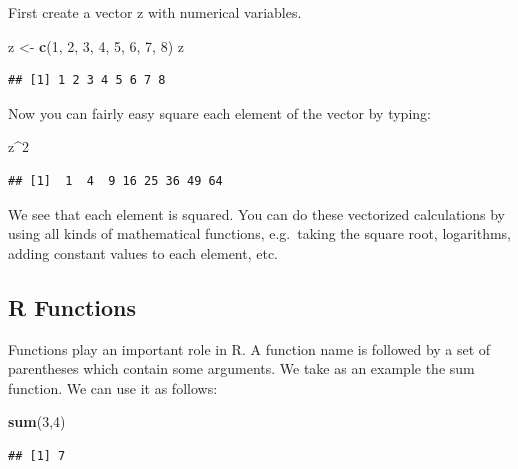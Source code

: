 \documentclass[
]{book}
\newenvironment{Shaded}{\begin{snugshade}}{\end{snugshade}}
\newcommand{\DecValTok}[1]{\textcolor[rgb]{0.00,0.00,0.81}{#1}}
\newcommand{\KeywordTok}[1]{\textcolor[rgb]{0.13,0.29,0.53}{\textbf{#1}}}
\newcommand{\NormalTok}[1]{#1}
\newcommand{\OperatorTok}[1]{\textcolor[rgb]{0.81,0.36,0.00}{\textbf{#1}}}
\newcommand{\StringTok}[1]{\textcolor[rgb]{0.31,0.60,0.02}{#1}}
\begin{document}
First create a vector z with numerical variables.

\begin{Shaded}
\begin{Highlighting}[]
\NormalTok{z <-}\StringTok{ }\KeywordTok{c}\NormalTok{(}\DecValTok{1}\NormalTok{, }\DecValTok{2}\NormalTok{, }\DecValTok{3}\NormalTok{, }\DecValTok{4}\NormalTok{, }\DecValTok{5}\NormalTok{, }\DecValTok{6}\NormalTok{, }\DecValTok{7}\NormalTok{, }\DecValTok{8}\NormalTok{)}
\NormalTok{z}
\end{Highlighting}
\end{Shaded}

\begin{verbatim}
## [1] 1 2 3 4 5 6 7 8
\end{verbatim}

Now you can fairly easy square each element of the vector by typing:

\begin{Shaded}
\begin{Highlighting}[]
\NormalTok{z}\OperatorTok{^}\DecValTok{2}
\end{Highlighting}
\end{Shaded}

\begin{verbatim}
## [1]  1  4  9 16 25 36 49 64
\end{verbatim}

We see that each element is squared. You can do these vectorized
calculations by using all kinds of mathematical functions, e.g.~taking
the square root, logarithms, adding constant values to each element,
etc.

\hypertarget{r-functions}{%
\subsection{R Functions}\label{r-functions}}

Functions play an important role in R. A function name is followed by a
set of parentheses which contain some arguments. We take as an example
the sum function. We can use it as follows:

\begin{Shaded}
\begin{Highlighting}[]
\KeywordTok{sum}\NormalTok{(}\DecValTok{3}\NormalTok{,}\DecValTok{4}\NormalTok{)}
\end{Highlighting}
\end{Shaded}

\begin{verbatim}
## [1] 7
\end{verbatim}
\end{document}
